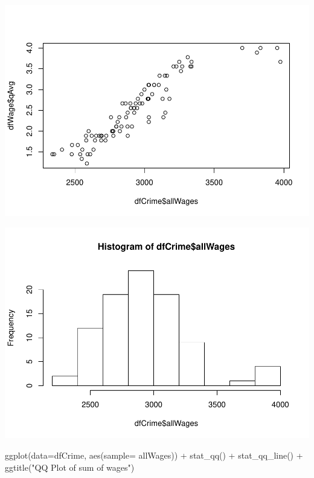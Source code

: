 \documentclass[]{article}
\newenvironment{Shaded}{}{}
\newcommand{\DataTypeTok}[1]{#1}
\newcommand{\KeywordTok}[1]{\textcolor[rgb]{0.00,0.00,1.00}{#1}}
\newcommand{\NormalTok}[1]{#1}
\newcommand{\OperatorTok}[1]{#1}
\newcommand{\StringTok}[1]{\textcolor[rgb]{0.00,0.50,0.50}{#1}}
\begin{document}
\includegraphics{Bagnard_Gaustad_Hartman_Leung_Lab_3_files/figure-latex/unnamed-chunk-78-1.pdf}

\begin{Shaded}
\end{Shaded}

\includegraphics{Bagnard_Gaustad_Hartman_Leung_Lab_3_files/figure-latex/unnamed-chunk-79-1.pdf}

\begin{Shaded}
\begin{Highlighting}[]
\KeywordTok{ggplot}\NormalTok{(}\DataTypeTok{data=}\NormalTok{dfCrime, }\KeywordTok{aes}\NormalTok{(}\DataTypeTok{sample=}\NormalTok{ allWages)) }\OperatorTok{+}\StringTok{ }\KeywordTok{stat_qq}\NormalTok{() }\OperatorTok{+}\StringTok{ }\KeywordTok{stat_qq_line}\NormalTok{() }\OperatorTok{+}
\StringTok{  }\KeywordTok{ggtitle}\NormalTok{(}\StringTok{"QQ Plot of sum of wages"}\NormalTok{)}
\end{Highlighting}
\end{Shaded}
\end{document}

